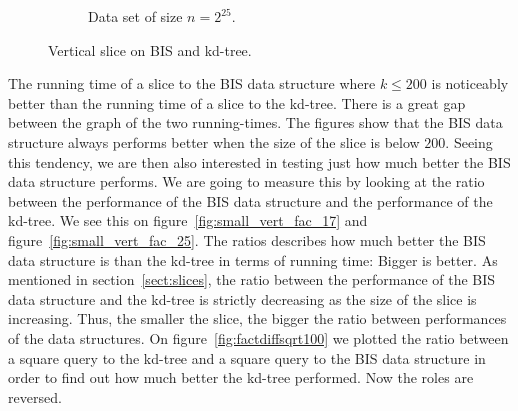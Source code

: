 \begin{figure}[h]
{\begin{subfigure}[b]{0.68\textwidth}
        \caption{Data set of size $n=2^{25}$.}
        \label{fig:small_vert_25}
    \end{subfigure}
  }
    \caption{Vertical slice on BIS and kd-tree.}
    \label{fig:small_vert_17_25}
  
\end{figure}

The running time of a slice to the BIS data structure where $k \leq 200$ is noticeably better than the running time of a slice to the kd-tree. There is a great gap between the graph of the two running-times. The figures show that the BIS data structure always performs better when the size of the slice is below $200$. Seeing this tendency, we are then also interested in testing just how much better the BIS data structure performs. We are going to measure this by looking at the ratio between the performance of the BIS data structure and the performance of the kd-tree. We see this on figure~\ref{fig:small_vert_fac_17} and figure~\ref{fig:small_vert_fac_25}. The ratios describes how much better the BIS data structure is than the kd-tree in terms of running time: Bigger is better. As mentioned in section~\ref{sect:slices}, the ratio between the performance of the BIS data structure and the kd-tree is strictly decreasing as the size of the slice is increasing. Thus, the smaller the slice, the bigger the ratio between performances of the data structures. On figure~\ref{fig:factdiffsqrt100} we plotted the ratio between a square query to the kd-tree and a square query to the BIS data structure in order to find out how much better the kd-tree performed. Now the roles are reversed.

